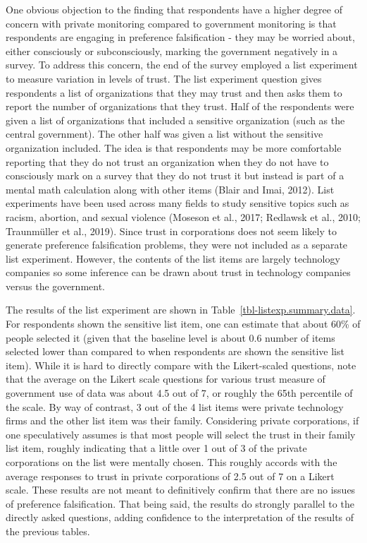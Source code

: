 \documentclass[
  letterpaper,
  DIV=11,
  numbers=noendperiod]{scrartcl}
\begin{document}
One obvious objection to the finding that respondents have a higher
degree of concern with private monitoring compared to government
monitoring is that respondents are engaging in preference falsification
- they may be worried about, either consciously or subconsciously,
marking the government negatively in a survey. To address this concern,
the end of the survey employed a list experiment to measure variation in
levels of trust. The list experiment question gives respondents a list
of organizations that they may trust and then asks them to report the
number of organizations that they trust. Half of the respondents were
given a list of organizations that included a sensitive organization
(such as the central government). The other half was given a list
without the sensitive organization included. The idea is that
respondents may be more comfortable reporting that they do not trust an
organization when they do not have to consciously mark on a survey that
they do not trust it but instead is part of a mental math calculation
along with other items (Blair and Imai, 2012). List experiments have
been used across many fields to study sensitive topics such as racism,
abortion, and sexual violence (Moseson et al., 2017; Redlawsk et al.,
2010; Traunmüller et al., 2019). Since trust in corporations does not
seem likely to generate preference falsification problems, they were not
included as a separate list experiment. However, the contents of the
list items are largely technology companies so some inference can be
drawn about trust in technology companies versus the government.

The results of the list experiment are shown in
Table~\ref{tbl-listexp.summary.data}. For respondents shown the
sensitive list item, one can estimate that about 60\% of people selected
it (given that the baseline level is about 0.6 number of items selected
lower than compared to when respondents are shown the sensitive list
item). While it is hard to directly compare with the Likert-scaled
questions, note that the average on the Likert scale questions for
various trust measure of government use of data was about 4.5 out of 7,
or roughly the 65th percentile of the scale. By way of contrast, 3 out
of the 4 list items were private technology firms and the other list
item was their family. Considering private corporations, if one
speculatively assumes is that most people will select the trust in their
family list item, roughly indicating that a little over 1 out of 3 of
the private corporations on the list were mentally chosen. This roughly
accords with the average responses to trust in private corporations of
2.5 out of 7 on a Likert scale. These results are not meant to
definitively confirm that there are no issues of preference
falsification. That being said, the results do strongly parallel to the
directly asked questions, adding confidence to the interpretation of the
results of the previous tables.
\end{document}
